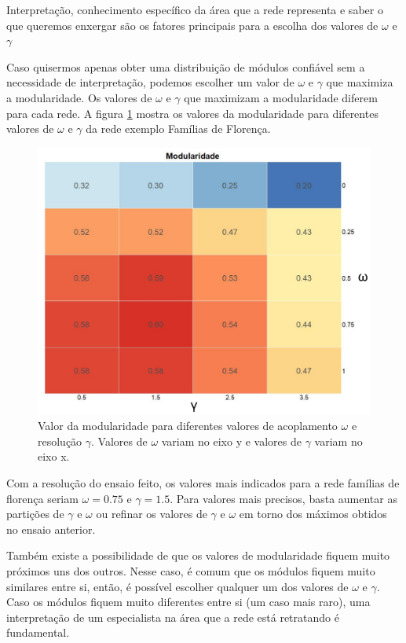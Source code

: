 \documentclass[
  12pt,
]{article}
\begin{document}
Interpretação, conhecimento específico da área que a rede representa e
saber o que queremos enxergar são os fatores principais para a escolha
dos valores de \(\omega\) e \(\gamma\)

Caso quisermos apenas obter uma distribuição de módulos confiável sem a
necessidade de interpretação, podemos escolher um valor de \(\omega\) e
\(\gamma\) que maximiza a modularidade. Os valores de \(\omega\) e
\(\gamma\) que maximizam a modularidade diferem para cada rede. A figura
\ref{fig:Mosaico3} mostra os valores da modularidade para diferentes
valores de \(\omega\) e \(\gamma\) da rede exemplo Famílias de Florença.

\begin{figure}[h!]
    \centering
    \includegraphics[width=1\textwidth]{./Figuras/Mosaico_modularidade_edit.png}
    \caption{Valor da modularidade para diferentes valores de acoplamento $\omega$ e resolução $\gamma$. Valores de $\omega$ variam no eixo y e valores de $\gamma$ variam no eixo x.}
    \label{fig:Mosaico3}
\end{figure}

Com a resolução do ensaio feito, os valores mais indicados para a rede
famílias de florença seriam \(\omega = 0.75\) e \(\gamma = 1.5\). Para
valores mais precisos, basta aumentar as partições de \(\gamma\) e
\(\omega\) ou refinar os valores de \(\gamma\) e \(\omega\) em torno dos
máximos obtidos no ensaio anterior.

Também existe a possibilidade de que os valores de modularidade fiquem
muito próximos uns dos outros. Nesse caso, é comum que os módulos fiquem
muito similares entre si, então, é possível escolher qualquer um dos
valores de \(\omega\) e \(\gamma\). Caso os módulos fiquem muito
diferentes entre si (um caso mais raro), uma interpretação de um
especialista na área que a rede está retratando é fundamental.
\end{document}
